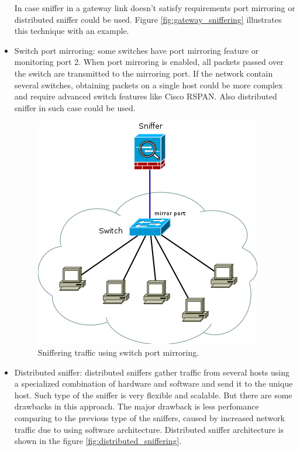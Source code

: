 \documentclass[thesis=M,english]{FITthesis}[2011/07/15]
\begin{document}
\begin{itemize}
In case sniffer in a gateway link doesn't satisfy requirements port mirroring or distributed sniffer could be used. Figure \ref{fig:gateway_sniffering} illustrates this technique with an example.
\item Switch port mirroring: some switches have port mirroring feature or monitoring port 2. When port mirroring is enabled, all packets passed over the switch are transmitted to the mirroring port. If the network contain several switches, obtaining packets on a single host could be more complex and require advanced switch features like Cisco RSPAN. Also distributed sniffer in such case could be used.

\begin{figure}[h]
\centering
\includegraphics[scale=0.6]{images/mirror_sniffering.png}
\caption{Sniffering traffic using switch port mirroring.}
\label{fig:mirror_sniffering}
\end{figure}

\item Distributed sniffer: distributed sniffers gather traffic from several hosts using a specialized combination of hardware and software and send it to the unique host. Such type of the sniffer is very flexible and scalable. But there are some drawbacks in this approach. The major drawback is less perfomance comparing to the previous type of the sniffers, caused by increased network traffic due to using software architecture. Distributed sniffer architecture is shown in the figure \ref{fig:distributed_sniffering}.


\end{itemize}
\end{document}
